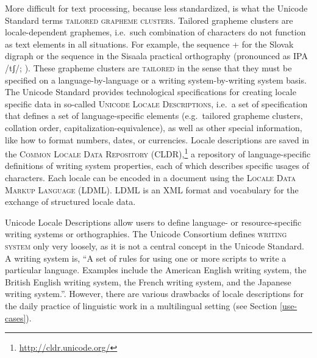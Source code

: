 More difficult for text processing, because less standardized, is what the Unicode Standard terms \textsc{tailored grapheme clusters}. Tailored grapheme clusters are locale-dependent graphemes, i.e.~such combination of characters do not function as text elements in all situations. For example, the sequence + for the Slovak digraph or the sequence in the Sisaala practical orthography (pronounced as IPA /tʃ/; \cite{Moran2006}). These grapheme clusters are \textsc{tailored} in the sense that they must be specified on a language-by-language or a writing system-by-writing system basis. The Unicode Standard provides technological specifications for creating locale specific data in so-called \textsc{Unicode Locale Descriptions}, i.e.~a set of specification that defines a set of language-specific elements (e.g.~tailored grapheme clusters, collation order, capitalization-equivalence), as well as other special information, like how to format numbers, dates, or currencies. Locale descriptions are saved in the \textsc{Common Locale Data Repository (CLDR)},\footnote{\url{http://cldr.unicode.org/}} a repository of language-specific definitions of writing system properties, each of which describes specific usages of characters. Each locale can be encoded in a document using the \textsc{Locale Data Markup Language (LDML)}. LDML is an XML format and vocabulary for the exchange of structured locale data.

Unicode Locale Descriptions allow users to define language- or resource-specific writing systems or orthographies. The Unicode Consortium defines \textsc{writing system} only very loosely, as it is not a central concept in the Unicode Standard. A writing system is, ``A set of rules for using one or more scripts to write a particular language. Examples include the American English writing system, the British English writing system, the French writing system, and the Japanese writing system.''. However, there are various drawbacks of locale descriptions for the daily practice of linguistic work in a multilingual setting (see Section \ref{use-cases}).